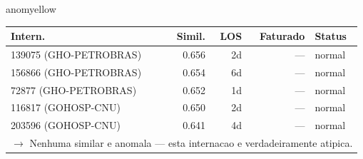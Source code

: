 \documentclass[a4paper,10pt]{article}
\begin{document}
\begin{anomalycard}[Internacao 108292 | GHO-PETROBRAS | MODERADO (z=2.06)]{anomyellow}
\begin{tabular}{l r r r l}\toprule\textbf{Intern.} & \textbf{Simil.} & \textbf{LOS} & \textbf{Faturado} & \textbf{Status} \\\midrule
139075 (GHO-PETROBRAS) & 0.656 & 2d & --- & \textcolor{jcubeblue}{normal} \\
156866 (GHO-PETROBRAS) & 0.654 & 6d & --- & \textcolor{jcubeblue}{normal} \\
72877 (GHO-PETROBRAS) & 0.652 & 1d & --- & \textcolor{jcubeblue}{normal} \\
116817 (GOHOSP-CNU) & 0.650 & 2d & --- & \textcolor{jcubeblue}{normal} \\
203596 (GOHOSP-CNU) & 0.641 & 4d & --- & \textcolor{jcubeblue}{normal} \\
\multicolumn{5}{l}{\textcolor{jcubeblue}{\small $\rightarrow$ Nenhuma similar e anomala --- esta internacao e verdadeiramente atipica.}} \\
\bottomrule\end{tabular}


\end{anomalycard}

\newpage
\end{document}
